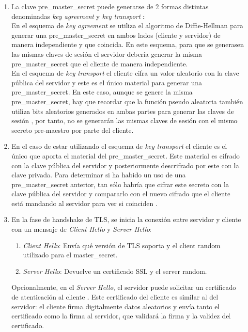 \documentclass[10pt,a4paper]{article}
\begin{document}
\begin{enumerate}[label=\alph*]
\item La clave pre\_master\_secret puede generarse de 2 formas distintas denominadas \textit{key agreement} y \textit{key transport} \cite{premaster}:\\
En el esquema de \textit{key agreement} se utiliza el algoritmo de Diffie-Hellman para generar una pre\_master\_secret en ambos lados (cliente y servidor) de manera independiente y que coincida. En este esquema, para que se generasen las mismas claves de sesión el servidor debería generar la misma pre\_master\_secret que el cliente de manera independiente.\\
En el esquema de \textit{key transport} el cliente cifra un valor aleatorio con la clave pública del servidor y este es el único material para generar una pre\_master\_secret. En este caso, aunque se genere la misma pre\_master\_secret, hay que recordar que la función pseudo aleatoria también utiliza bits aleatorios generados en ambas partes para generar las claves de sesión \cite{cloudfare} \cite{cryptosoft}, por tanto, no se generarán las mismas claves de sesión con el mismo secreto pre-maestro por parte del cliente.

\item En el caso de estar utilizando el esquema de \textit{key transport} el cliente es el único que aporta el material del pre\_master\_secret. Este material es cifrado con la clave pública del servidor y posteriormente descrifrado por este con la clave privada. Para determinar si ha habido un uso de una pre\_master\_secret anterior, tan sólo habría que cifrar este secreto con la clave pública del servidor y compararlo con el nuevo cifrado que el cliente está mandando al servidor para ver si coinciden \cite{premaster}.

\item En la fase de handshake de TLS, se inicia la conexión entre servidor y cliente con un mensaje de \textit{Client Hello} y \textit{Server Hello}:
\begin{enumerate}[label=(\arabic*)]
\item \textit{Client Hell}o: Envía qué versión de TLS soporta y el client random utilizado para el master\_secret.
\item \textit{Server Hell}o: Devuelve un certificado SSL y el server random.
\end{enumerate}
Opcionalmente, en el \textit{Server Hello}, el servidor puede solicitar un certificado de atenticación al cliente \cite{rfc5246_7.4.6}. Este certificado del cliente es similar al del servidor: el cliente firma digitalmente datos aleatorios y envía tanto el certificado como la firma al servidor, que validará la firma y la validez del certificado. \cite{redhat}

\end{enumerate}
\end{document}
